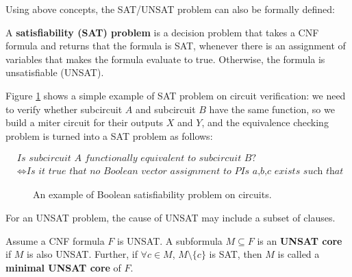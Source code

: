 Using above concepts, the SAT/UNSAT problem can also be formally defined:
\begin{Definition}
A {\bf satisfiability (SAT) problem} is a decision problem that takes a CNF formula and returns
that the formula is SAT, whenever there is an assignment of variables that makes the 
formula evaluate to true. Otherwise, the formula is unsatisfiable (UNSAT).
\end{Definition}

Figure \ref{fig:SAT} shows a simple example of SAT problem on circuit verification:
we need to verify whether subcircuit $A$ and subcircuit $B$ have the same function, so
we build a miter circuit for their outputs $X$ and $Y$, and the equivalence checking 
problem is turned into a SAT problem as follows:

\vspace{-0.5in}
\begin{center}
\begin{align*}
&\textit{Is\ subcircuit\ A\ functionally\ equivalent\ to\ subcircuit\ B?}\\
&\Longleftrightarrow
\textit{Is\ it\ true\ that\ no\ Boolean\ vector\ assignment\ to\ PIs\ a,b,c\ exists\ such\ that\ Z=1?}
\end{align*}
\end{center}

\begin{figure}[H]
\caption{An example of Boolean satisfiability problem on circuits.}
\label{fig:SAT}
\end{figure}

For an UNSAT problem, the cause of UNSAT may include a subset of clauses.
\begin{Definition}
Assume a CNF formula $F$ is UNSAT. A subformula $M \subseteq F$ is an {\bf UNSAT core} 
if $M$ is also UNSAT. Further, if $\forall c\in M$, $M\setminus\{c\}$ is SAT, then 
$M$ is called a {\bf minimal UNSAT core} of $F$.
\end{Definition}

